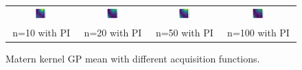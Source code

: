 \documentclass[11pt]{article}
\begin{document}
\begin{figure}[H]
\begin{tabular}{cccc}
        \includegraphics[width=0.225\textwidth]{../Task-02/plots/gp_mean_matern_n10_PI.png} &
        \includegraphics[width=0.225\textwidth]{../Task-02/plots/gp_mean_matern_n20_PI.png} &
        \includegraphics[width=0.225\textwidth]{../Task-02/plots/gp_mean_matern_n50_PI.png} &
        \includegraphics[width=0.225\textwidth]{../Task-02/plots/gp_mean_matern_n100_PI.png} \\
        n=10 with PI & n=20 with PI & n=50 with PI & n=100 with PI \\
    \end{tabular}
    \caption{Matern kernel GP mean with different acquisition functions.}
    \label{fig:matern_gp_mean}
\end{figure}
\end{document}
